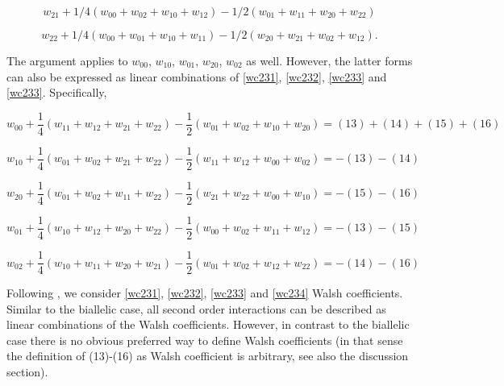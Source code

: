 \documentclass[12pt]{amsart}
\theoremstyle{plain}
\theoremstyle{definition}
\begin{document}
\begin{equation}\label{wc233}
w_{21}+1/4 (w_{00}+w_{02}+w_{10}+w_{12}) - 1/2  \left(w_{01}+w_{11}+w_{20}+w_{22} \right) 
\end{equation}

\begin{equation}\label{wc234}
w_{22}+1/4 (w_{00}+w_{01}+w_{10}+w_{11}) - 1/2  \left(w_{20}+w_{21}+w_{02}+w_{12} \right).
\end{equation}


The argument applies to $w_{00}$, $w_{10}$, $w_{01}$, $w_{20}$, $w_{02}$ as well. However,
the latter forms can also be expressed as  linear combinations of \ref{wc231},  \ref{wc232}, \ref{wc233} and \ref{wc233}.
Specifically,

\[
w_{00} + \frac{1}{4}(w_{11} + w_{12} +w_{21}+w_{22})-\frac{1}{2}(w_{01} +w_{02}+w_{10}+w_{20}) 
=(13)+(14)+(15)+(16)
\]


\[
w_{10} +  \frac{1}{4}(w_{01}+w_{02}+w_{21}+w_{22}) - \frac{1}{2} (w_{11}+w_{12}+w_{00}+w_{02}) 
=-(13)-(14)
\]



\[
w_{20} +  \frac{1}{4} (w_{01}+w_{02}+w_{11}+w_{22})  - \frac{1}{2} (w_{21}+w_{22}+w_{00}+w_{10})  
=-(15)-(16)
\]



\[
w_{01}+   \frac{1}{4} (w_{10}+w_{12}+w_{20}+w_{22}) - \frac{1}{2}(w_{00}+w_{02}+w_{11}+w_{12})  
=-(13)-(15)
\]


\[
w_{02} + \frac{1}{4}( w_{10}+w_{11}+w_{20}+w_{21}) -\frac{1}{2}(w_{01}+w_{02}+ w_{12}+w_{22})   
=-(14)-(16)
\]


Following \citep{gs}, we consider \ref{wc231},  \ref{wc232},  \ref{wc233} and  \ref{wc234} 
Walsh coefficients. Similar to the biallelic case, all second order interactions 
can be described as linear combinations of the Walsh coefficients.
However, in contrast to the biallelic case there is no obvious preferred
way to define Walsh coefficients (in that sense 
the definition of (13)-(16) as Walsh coefficient is arbitrary, see also the discussion section).
\end{document}
